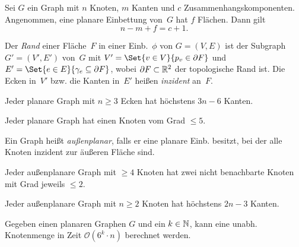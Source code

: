 \documentclass{cheat-sheet}
\renewcommand{\O}{\mathcal{O}} %
\newcommand{\boundary}{\partial} %
\newcommand{\Youtube}[1]{\href{https://www.youtube.com/watch?v=#1}{\textcolor{YoutubeColor}{$\blacktriangleright$}}}
\begin{document}
\begin{satz}[\emph{Euler-Formel}, \Youtube{5ywif1Zpeo4}]
  Sei $G$ ein Graph mit $n$ Knoten, $m$ Kanten und $c$ Zusammenhangskomponenten.
  Angenommen, eine planare Einbettung von~$G$ hat $f$ Flächen.
  Dann gilt
  \[ n - m + f = c + 1. \]
\end{satz}

\begin{defn}
  Der \emph{Rand} einer Fläche~$F$ in einer Einb.~$\phi$ von $G = (V, E)$ ist der Subgraph $G' = (V', E')$ von~$G$ mit $V' = \Set{v \in V}{p_v \in \boundary{F}}$ und $E' = \Set{e \in E}{\gamma_e \subseteq \boundary{F}}$, wobei $\boundary F \subset \R^2$ der topologische Rand ist.
  Die Ecken in~$V'$ bzw. die Kanten in~$E'$ heißen \emph{inzident} an~$F$.
\end{defn}

\begin{lem}[\Youtube{_d_6JvceAwE}]
  \begin{minipage}[t]{0.75 \linewidth}
    Jeder planare Graph mit $n \geq 3$ Ecken hat höchstens $3 n - 6$ Kanten.
  \end{minipage}
\end{lem}

\begin{kor}
  Jeder planare Graph hat einen Knoten vom Grad $\leq 5$.
\end{kor}

\begin{defn}
  Ein Graph heißt \emph{außenplanar}, falls er eine planare Einb. besitzt, bei der alle Knoten inzident zur äußeren Fläche sind.
\end{defn}

\begin{lem}
  \begin{minipage}[t]{0.8 \linewidth}
    Jeder außenplanare Graph mit $\geq 4$ Knoten hat zwei nicht benachbarte Knoten mit Grad jeweils $\leq 2$.
  \end{minipage}
\end{lem}

\begin{lem}
  \begin{minipage}[t]{0.72 \linewidth}
    Jeder außenplanare Graph mit $n \geq 2$ Knoten hat höchstens $2 n - 3$ Kanten.
  \end{minipage}
\end{lem}


\begin{satz}
  Gegeben einen planaren Graphen $G$ und ein $k \in \mathbb{N}$, kann eine unabh. Knotenmenge in Zeit $\O(6^k \cdot n)$ berechnet werden.
\end{satz}
\end{document}
